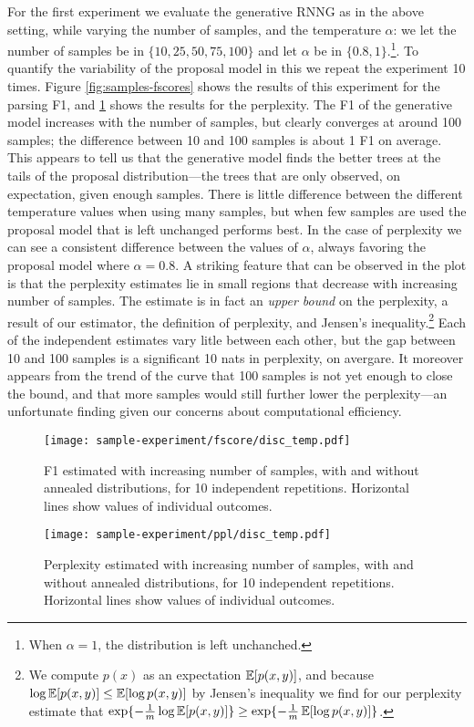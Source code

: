    For the first experiment we evaluate the generative RNNG as in the above setting, while varying the number of samples, and the temperature $\alpha$: we let the number of samples be in $\{ 10, 25, 50, 75, 100 \}$ and let $\alpha$ be in $\{ 0.8, 1 \}$.\footnote{When $\alpha=1$, the distribution is left unchanched.}. To quantify the variability of the proposal model in this we repeat the experiment 10 times. Figure \ref{fig:samples-fscores} shows the results of this experiment for the parsing F1, and \ref{fig:samples-perplexities} shows the results for the perplexity. The F1 of the generative model increases with the number of samples, but clearly converges at around 100 samples; the difference between 10 and 100 samples is about 1 F1 on average. This appears to tell us that the generative model finds the better trees at the tails of the proposal distribution---the trees that are only observed, on expectation, given enough samples. There is little difference between the different temperature values when using many samples, but when few samples are used the proposal model that is left unchanged performs best. In the case of perplexity we can see a consistent difference between the values of $\alpha$, always favoring the proposal model where $\alpha = 0.8$. A striking feature that can be observed in the plot is that the perplexity estimates lie in small regions that decrease with increasing number of samples. The estimate is in fact an \textit{upper bound} on the perplexity, a result of our estimator, the definition of perplexity, and Jensen's inequality.\footnote{We compute $p(x)$ as an expectation $\operatorname{\mathbb{E}} [p(x,y)]$, and because $\log \operatorname{\mathbb{E}} [p(x,y)] \leq \operatorname{\mathbb{E}} [\log p(x,y)]$ by Jensen's inequality we find for our perplexity estimate that $\exp \{ - \frac{1}{m} \log \operatorname{\mathbb{E}} [p(x,y)] \} \geq \exp \{ - \frac{1}{m} \operatorname{\mathbb{E}} [\log p(x,y)] \} $.} Each of the independent estimates vary litle between each other, but the gap between 10 and 100 samples is a significant 10 nats in perplexity, on avergare. It moreover appears from the trend of the curve that 100 samples is not yet enough to close the bound, and that more samples would still further lower the perplexity---an unfortunate finding given our concerns about computational efficiency.

    \begin{figure}[h]
      \center
    	\texttt{[image: sample-experiment/fscore/disc\_temp.pdf]}
      \caption{F1 estimated with increasing number of samples, with and without annealed distributions, for 10 independent repetitions. Horizontal lines show values of individual outcomes.}
      \label{fig:samples-fscores}

    	\texttt{[image: sample-experiment/ppl/disc\_temp.pdf]}
      \caption{Perplexity estimated with increasing number of samples, with and without annealed distributions, for 10 independent repetitions. Horizontal lines show values of individual outcomes.}
      \label{fig:samples-perplexities}
    \end{figure}

